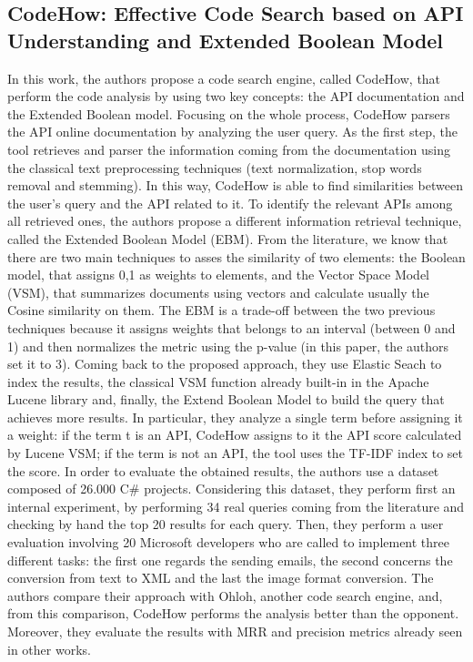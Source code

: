 \subsection{CodeHow: Effective Code Search based on API Understanding and Extended Boolean Model}
In this work, the authors propose a code search engine, called CodeHow, that perform the code analysis by using two key concepts: the API documentation and the Extended Boolean model. Focusing on the whole process, CodeHow parsers the API online documentation by analyzing the user query. As the first step, the tool retrieves and parser the information coming from the documentation using the classical text preprocessing techniques (text normalization, stop words removal and stemming). In this way, CodeHow is able to find similarities between the user’s query and the API related to it. To identify the relevant APIs among all retrieved ones, the authors propose a different information retrieval technique, called the Extended Boolean Model (EBM). From the literature, we know that there are two main techniques to asses the similarity of two elements: the Boolean model, that assigns 0,1 as weights to elements, and the Vector Space Model (VSM), that summarizes documents using vectors and calculate usually the Cosine similarity on them. The EBM is a trade-off between the two previous techniques because it assigns weights that belongs to an interval (between 0 and 1) and then normalizes the metric using the p-value (in this paper, the authors set it to 3).
Coming back to the proposed approach, they use Elastic Seach to index the results, the classical VSM function already built-in in the Apache Lucene library and, finally, the Extend Boolean Model to build the query that achieves more results. In particular, they analyze a single term before assigning it a weight: if the term t is an API, CodeHow assigns to it the API score calculated by Lucene VSM; if the term is not an API, the tool uses the TF-IDF index to set the score. In order to evaluate the obtained results, the authors use a dataset composed of 26.000 C\# projects. Considering this dataset, they perform first an internal experiment, by performing 34 real queries coming from the literature and checking by hand the top 20 results for each query. Then, they perform a user evaluation involving 20 Microsoft developers who are called to implement three different tasks: the first one regards the sending emails, the second concerns the conversion from text to XML and the last the image format conversion. The authors compare their approach with Ohloh, another code search engine, and, from this comparison, CodeHow performs the analysis better than the opponent. Moreover, they evaluate the results with MRR and precision metrics already seen in other works.  


